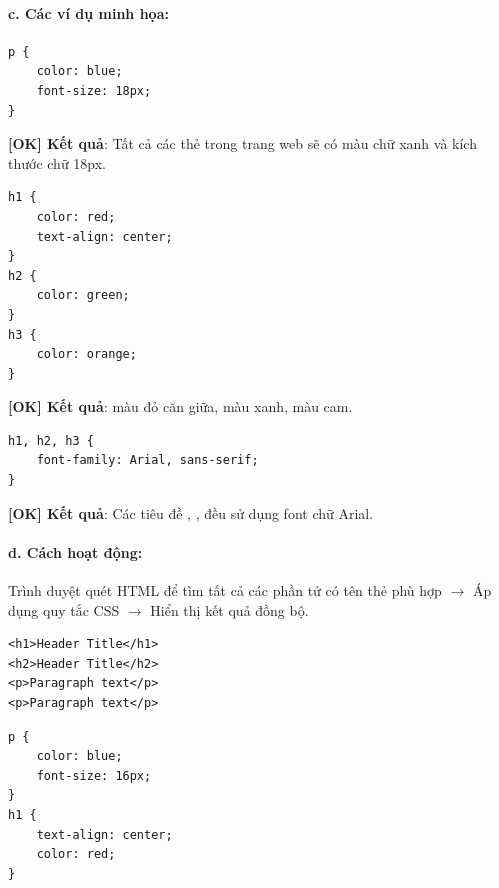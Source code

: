 \paragraph{c. Các ví dụ minh họa:}
\begin{codeWindow}
\begin{lstlisting}[language=CSS3]
p {
    color: blue;
    font-size: 18px;
}
\end{lstlisting}
\end{codeWindow}
\textcolor{tipBorder}{\textbf{[OK] Kết quả}}: Tất cả các thẻ  trong trang web sẽ có màu chữ xanh và kích thước chữ 18px.

\begin{codeWindow}
\begin{lstlisting}[language=CSS3]
h1 {
    color: red;
    text-align: center;
}
h2 {
    color: green;
}
h3 {
    color: orange;
}
\end{lstlisting}
\end{codeWindow}
\textcolor{tipBorder}{\textbf{[OK] Kết quả}}:  màu đỏ căn giữa,  màu xanh,  màu cam.

\begin{codeWindow}
\begin{lstlisting}[language=CSS3]
h1, h2, h3 {
    font-family: Arial, sans-serif;
}
\end{lstlisting}
\end{codeWindow}
\textcolor{tipBorder}{\textbf{[OK] Kết quả}}: Các tiêu đề , ,  đều sử dụng font chữ Arial.

\paragraph{d. Cách hoạt động:}
Trình duyệt quét HTML để tìm tất cả các phần tử có tên thẻ phù hợp $\rightarrow$ Áp dụng quy tắc CSS $\rightarrow$ Hiển thị kết quả đồng bộ.

\begin{codeWindow}
\begin{lstlisting}[language=HTML5]
<h1>Header Title</h1>
<h2>Header Title</h2>
<p>Paragraph text</p>
<p>Paragraph text</p>
\end{lstlisting}

\begin{lstlisting}[language=CSS3]
p {
    color: blue;
    font-size: 16px;
}
h1 {
    text-align: center;
    color: red;
}
\end{lstlisting}
\end{codeWindow}


